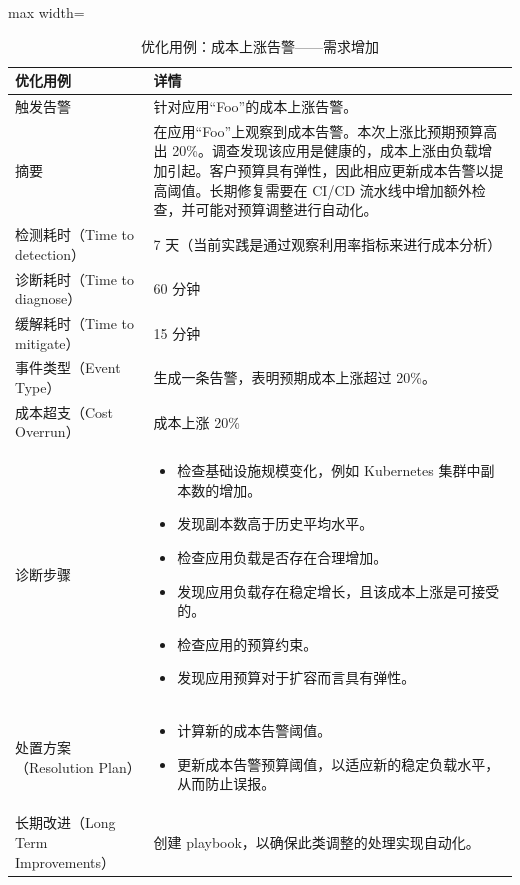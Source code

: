 \documentclass[10pt,UTF8,fontset=fandol]{ctexart}
\begin{document}
\begin{table}[H]
\centering
\caption{优化用例：成本上涨告警——需求增加}
\label{tab:e25}
\begin{adjustbox}{max width=\linewidth}
\begin{tabular}{@{}p{3.2cm}p{11cm}@{}}
\toprule
\textbf{优化用例} & \textbf{详情} \\
\midrule
触发告警 & 针对应用“Foo”的成本上涨告警。 \\
\addlinespace
摘要 & 在应用“Foo”上观察到成本告警。本次上涨比预期预算高出 20\%。调查发现该应用是健康的，成本上涨由负载增加引起。客户预算具有弹性，因此相应更新成本告警以提高阈值。长期修复需要在 CI/CD 流水线中增加额外检查，并可能对预算调整进行自动化。 \\
\addlinespace
检测耗时（Time to detection） & 7 天（当前实践是通过观察利用率指标来进行成本分析） \\
诊断耗时（Time to diagnose） & 60 分钟 \\
缓解耗时（Time to mitigate） & 15 分钟 \\
事件类型（Event Type） & 生成一条告警，表明预期成本上涨超过 20\%。 \\
成本超支（Cost Overrun） & 成本上涨 20\% \\
\addlinespace
诊断步骤 &
\begin{itemize}[leftmargin=*,nosep]
\item 检查基础设施规模变化，例如 Kubernetes 集群中副本数的增加。
\item 发现副本数高于历史平均水平。
\item 检查应用负载是否存在合理增加。
\item 发现应用负载存在稳定增长，且该成本上涨是可接受的。
\item 检查应用的预算约束。
\item 发现应用预算对于扩容而言具有弹性。
\end{itemize} \\
\addlinespace
处置方案（Resolution Plan） &
\begin{itemize}[leftmargin=*,nosep]
\item 计算新的成本告警阈值。
\item 更新成本告警预算阈值，以适应新的稳定负载水平，从而防止误报。
\end{itemize} \\
\addlinespace
长期改进（Long Term Improvements） & 创建 playbook，以确保此类调整的处理实现自动化。 \\
\bottomrule
\end{tabular}
\end{adjustbox}
\end{table}
\end{document}
